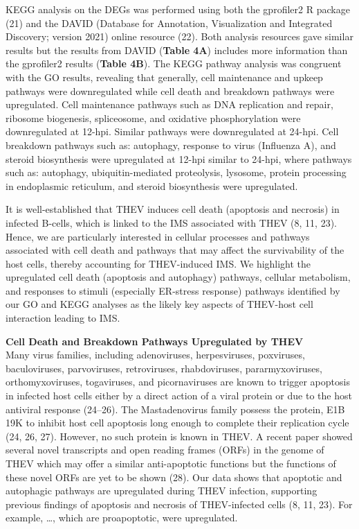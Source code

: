 \documentclass[
]{article}
\begin{document}
KEGG analysis on the DEGs was performed using both the gprofiler2 R
package (21) and the DAVID (Database for Annotation, Visualization and
Integrated Discovery; version 2021) online resource (22). Both analysis
resources gave similar results but the results from DAVID (\textbf{Table
4A}) includes more information than the gprofiler2 results
(\textbf{Table 4B}). The KEGG pathway analysis was congruent with the GO
results, revealing that generally, cell maintenance and upkeep pathways
were downregulated while cell death and breakdown pathways were
upregulated. Cell maintenance pathways such as DNA replication and
repair, ribosome biogenesis, spliceosome, and oxidative phosphorylation
were downregulated at 12-hpi. Similar pathways were downregulated at
24-hpi. Cell breakdown pathways such as: autophagy, response to virus
(Influenza A), and steroid biosynthesis were upregulated at 12-hpi
similar to 24-hpi, where pathways such as: autophagy, ubiquitin-mediated
proteolysis, lysosome, protein processing in endoplasmic reticulum, and
steroid biosynthesis were upregulated.

It is well-established that THEV induces cell death (apoptosis and
necrosis) in infected B-cells, which is linked to the IMS associated
with THEV (8, 11, 23). Hence, we are particularly interested in cellular
processes and pathways associated with cell death and pathways that may
affect the survivability of the host cells, thereby accounting for
THEV-induced IMS. We highlight the upregulated cell death (apoptosis and
autophagy) pathways, cellular metabolism, and responses to stimuli
(especially ER-stress response) pathways identified by our GO and KEGG
analyses as the likely key aspects of THEV-host cell interaction leading
to IMS.

\textbf{Cell Death and Breakdown Pathways Upregulated by THEV}\\
Many virus families, including adenoviruses, herpesviruses, poxviruses,
baculoviruses, parvoviruses, retroviruses, rhabdoviruses,
pararmyxoviruses, orthomyxoviruses, togaviruses, and picornaviruses are
known to trigger apoptosis in infected host cells either by a direct
action of a viral protein or due to the host antiviral response
(24--26). The Mastadenovirus family possess the protein, E1B 19K to
inhibit host cell apoptosis long enough to complete their replication
cycle (24, 26, 27). However, no such protein is known in THEV. A recent
paper showed several novel transcripts and open reading frames (ORFs) in
the genome of THEV which may offer a similar anti-apoptotic functions
but the functions of these novel ORFs are yet to be shown (28). Our data
shows that apoptotic and autophagic pathways are upregulated during THEV
infection, supporting previous findings of apoptosis and necrosis of
THEV-infected cells (8, 11, 23). For example, \ldots, which are
proapoptotic, were upregulated.
\end{document}
